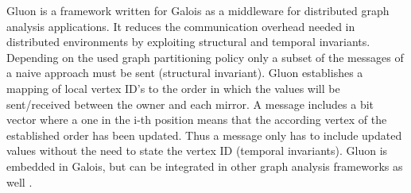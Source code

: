 
Gluon \cite{vertGalois} is a framework written for Galois as a middleware for distributed graph analysis applications. It reduces the communication overhead needed in distributed environments by exploiting structural and temporal invariants. Depending on the used graph partitioning policy only a subset of the messages of a naive approach must be sent (structural invariant). Gluon establishes a mapping of local vertex ID's to the order in which the values will be sent/received between the owner and each mirror. A message includes a bit vector where a one in the i-th position means that the according vertex of the established order has been updated. Thus a message only has to include updated values without the need to state the vertex ID (temporal invariants). Gluon is embedded in Galois, but can be integrated in other graph analysis frameworks as well \cite{vertGalois}.

